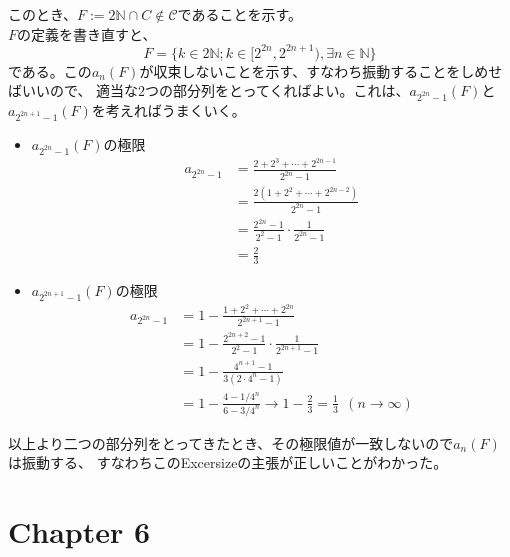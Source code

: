 \documentclass[11pt, a4paper]{jsarticle}
\theoremstyle{definition}
\newcommand{\NN}{{\mathbb{N}}} %
\begin{document}
      このとき、$F := 2\NN\cap C\not\in \mathcal{C}$であることを示す。\\
      $F$の定義を書き直すと、
      \[
        F = \{k\in2\NN;k\in[2^{2n}, 2^{2n+1}),\exists n\in\NN\}
      \]
      である。この$a_n(F)$が収束しないことを示す、すなわち振動することをしめせばいいので、
      適当な$2$つの部分列をとってくればよい。これは、$a_{2^{2n}-1}(F)$と$a_{2^{2n + 1}-1}(F)$を考えればうまくいく。
      \begin{itemize}
        \item $a_{2^{2n} - 1}(F)$の極限
          \begin{align*}
            a_{2^{2n} - 1} &= \frac{2 + 2^3 + \cdots + 2^{2n - 1}}{2^{2n} - 1}\\
            &= \frac{2(1 + 2^2 + \cdots + 2^{2n-2})}{2^{2n} - 1}\\
            &= \frac{2^{2n} - 1}{2^2-1} \cdot \frac{1}{2^{2n} - 1}\\
            &= \frac{2}{3}
          \end{align*}
        \item $a_{2^{2n + 1} - 1}(F)$の極限
          \begin{align*}
            a_{2^{2n} - 1} &= 1 - \frac{1 + 2^2 + \cdots + 2^{2n}}{2^{2n + 1} - 1}\\
            &= 1 - \frac{2^{2n + 2} - 1}{2^2-1} \cdot \frac{1}{2^{2n + 1} - 1}\\
            &= 1 - \frac{4^{n + 1} - 1}{3(2 \cdot 4^n - 1)}\\
            &= 1 - \frac{4 - 1/4^n}{6 - 3/4^n} \to 1 - \frac{2}{3} = \frac{1}{3}\ \ (n\to\infty)
          \end{align*}
      \end{itemize}
      以上より二つの部分列をとってきたとき、その極限値が一致しないので$a_n(F)$は振動する、
      すなわちこのExcersizeの主張が正しいことがわかった。




  \section{Chapter 6}
\end{document}
